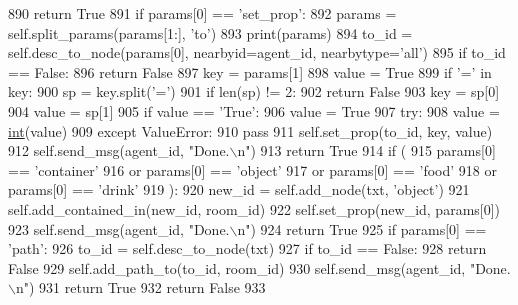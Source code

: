 \begin{DoxyCode}
890             \textcolor{keywordflow}{return} \textcolor{keyword}{True}
891         \textcolor{keywordflow}{if} params[0] == \textcolor{stringliteral}{'set\_prop'}:
892             params = self.split\_params(params[1:], \textcolor{stringliteral}{'to'})
893             print(params)
894             to\_id = self.desc\_to\_node(params[0], nearbyid=agent\_id, nearbytype=\textcolor{stringliteral}{'all'})
895             \textcolor{keywordflow}{if} to\_id == \textcolor{keyword}{False}:
896                 \textcolor{keywordflow}{return} \textcolor{keyword}{False}
897             key = params[1]
898             value = \textcolor{keyword}{True}
899             \textcolor{keywordflow}{if} \textcolor{stringliteral}{'='} \textcolor{keywordflow}{in} key:
900                 sp = key.split(\textcolor{stringliteral}{'='})
901                 \textcolor{keywordflow}{if} len(sp) != 2:
902                     \textcolor{keywordflow}{return} \textcolor{keyword}{False}
903                 key = sp[0]
904                 value = sp[1]
905                 \textcolor{keywordflow}{if} value == \textcolor{stringliteral}{'True'}:
906                     value = \textcolor{keyword}{True}
907                 \textcolor{keywordflow}{try}:
908                     value = \hyperlink{namespacelanguage__model_1_1eval__ppl_a7d12ee00479673c5c8d1f6d01faa272a}{int}(value)
909                 \textcolor{keywordflow}{except} ValueError:
910                     \textcolor{keywordflow}{pass}
911             self.set\_prop(to\_id, key, value)
912             self.send\_msg(agent\_id, \textcolor{stringliteral}{"Done.\(\backslash\)n"})
913             \textcolor{keywordflow}{return} \textcolor{keyword}{True}
914         \textcolor{keywordflow}{if} (
915             params[0] == \textcolor{stringliteral}{'container'}
916             \textcolor{keywordflow}{or} params[0] == \textcolor{stringliteral}{'object'}
917             \textcolor{keywordflow}{or} params[0] == \textcolor{stringliteral}{'food'}
918             \textcolor{keywordflow}{or} params[0] == \textcolor{stringliteral}{'drink'}
919         ):
920             new\_id = self.add\_node(txt, \textcolor{stringliteral}{'object'})
921             self.add\_contained\_in(new\_id, room\_id)
922             self.set\_prop(new\_id, params[0])
923             self.send\_msg(agent\_id, \textcolor{stringliteral}{"Done.\(\backslash\)n"})
924             \textcolor{keywordflow}{return} \textcolor{keyword}{True}
925         \textcolor{keywordflow}{if} params[0] == \textcolor{stringliteral}{'path'}:
926             to\_id = self.desc\_to\_node(txt)
927             \textcolor{keywordflow}{if} to\_id == \textcolor{keyword}{False}:
928                 \textcolor{keywordflow}{return} \textcolor{keyword}{False}
929             self.add\_path\_to(to\_id, room\_id)
930             self.send\_msg(agent\_id, \textcolor{stringliteral}{"Done.\(\backslash\)n"})
931             \textcolor{keywordflow}{return} \textcolor{keyword}{True}
932         \textcolor{keywordflow}{return} \textcolor{keyword}{False}
933 
\end{DoxyCode}
